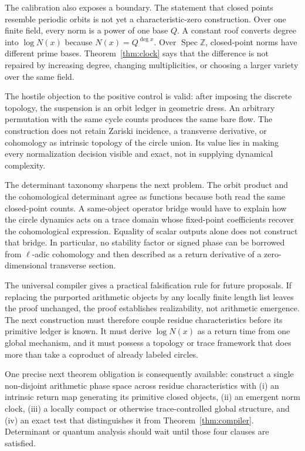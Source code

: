 \documentclass[11pt]{article}
\theoremstyle{definition}
\theoremstyle{remark}
\newcommand{\Z}{\mathbb{Z}}
\newcommand{\Spec}{\operatorname{Spec}}
\begin{document}
The calibration also exposes a boundary.  The statement that closed points
resemble periodic orbits is not yet a characteristic-zero construction.  Over one finite field, every
norm is a power of one base \(Q\).  A constant roof converts degree into
\(\log N(x)\) because \(N(x)=Q^{\deg x}\).  Over \(\Spec\Z\), closed-point
norms have different prime bases.  Theorem~\ref{thm:clock} says that the
difference is not repaired by increasing degree, changing multiplicities, or
choosing a larger variety over the same field.

The hostile objection to the positive control is valid: after imposing the
discrete topology, the suspension is an orbit ledger in geometric dress.  An
arbitrary permutation with the same cycle counts produces the same bare flow.
The construction does not retain Zariski incidence, a transverse derivative,
or cohomology as intrinsic topology of the circle union.  Its value lies in
making every normalization decision visible and exact, not in supplying
dynamical complexity.

The determinant taxonomy sharpens the next problem.  The orbit product and
the cohomological determinant agree as functions because both read the same
closed-point counts.  A same-object operator bridge would have to explain how
the circle dynamics acts on a trace domain whose fixed-point coefficients
recover the cohomological expression.  Equality of scalar outputs alone does
not construct that bridge.  In particular, no stability factor or signed
phase can be borrowed from \(\ell\)-adic cohomology and then described as a
return derivative of a zero-dimensional transverse section.

The universal compiler gives a practical falsification rule for future
proposals.  If replacing the purported arithmetic objects by any locally
finite length list leaves the proof unchanged, the proof establishes
realizability, not arithmetic emergence.  The next construction must therefore
couple residue characteristics before its primitive ledger is known.  It must
derive \(\log N(x)\) as a return time from one global mechanism, and it must
possess a topology or trace framework that does more than take a coproduct of
already labeled circles.

One precise next theorem obligation is consequently available:
construct a single non-disjoint arithmetic phase space across residue
characteristics with (i) an intrinsic return map generating its primitive
closed objects, (ii) an emergent norm clock, (iii) a locally compact or
otherwise trace-controlled global structure, and (iv) an exact test that
distinguishes it from Theorem~\ref{thm:compiler}.  Determinant or quantum
analysis should wait until those four clauses are satisfied.
\end{document}
